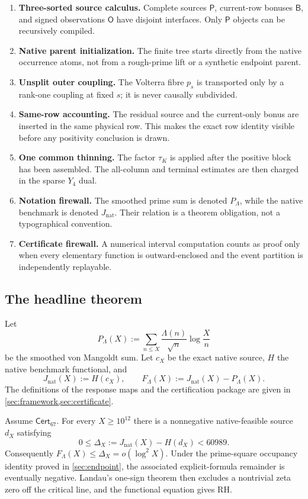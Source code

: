 \documentclass[11pt]{article}
\theoremstyle{definition}
\theoremstyle{remark}
\newcommand{\RH}{\mathrm{RH}}
\newcommand{\1}{\mathbf 1}
\newcommand{\Cert}{\mathsf{Cert}_{67}}
\newcommand{\Src}{\mathsf P}
\newcommand{\Bonus}{\mathsf B}
\newcommand{\Obs}{\mathsf O}
\newcommand{\Nat}{\mathrm{nat}}
\begin{document}
\begin{enumerate}
\item \textbf{Three-sorted source calculus.}  Complete sources \(\Src\), current-row bonuses \(\Bonus\), and signed observations \(\Obs\) have disjoint interfaces.  Only \(\Src\) objects can be recursively compiled.
\item \textbf{Native parent initialization.}  The finite tree starts directly from the native occurrence atoms, not from a rough-prime lift or a synthetic endpoint parent.
\item \textbf{Unsplit outer coupling.}  The Volterra fibre \(p_s\) is transported only by a rank-one coupling at fixed \(s\); it is never causally subdivided.
\item \textbf{Same-row accounting.}  The residual source and the current-only bonus are inserted in the same physical row.  This makes the exact row identity visible before any positivity conclusion is drawn.
\item \textbf{One common thinning.}  The factor \(\tau_K\) is applied after the positive block has been assembled.  The all-column and terminal estimates are then charged in the sparse \(Y_4\) dual.
\item \textbf{Notation firewall.}  The smoothed prime sum is denoted \(P_\Lambda\), while the native benchmark is denoted \(J_{\Nat}\).  Their relation is a theorem obligation, not a typographical convention.
\item \textbf{Certificate firewall.}  A numerical interval computation counts as proof only when every elementary function is outward-enclosed and the event partition is independently replayable.
\end{enumerate}

\subsection{The headline theorem}

Let
\begin{equation}\label{eq:prime-sum}
P_\Lambda(X):=\sum_{n\le X}\frac{\Lambda(n)}{\sqrt n}\log\frac Xn
\end{equation}
be the smoothed von Mangoldt sum.  Let \(c_X\) be the exact native source, \(H\) the native benchmark functional, and
\[
J_{\Nat}(X):=H(c_X),\qquad F_\Lambda(X):=J_{\Nat}(X)-P_\Lambda(X).
\]
The definitions of the response maps and the certification package are given in \cref{sec:framework,sec:certificate}.

\begin{resultbox}
Assume \(\Cert\).  For every \(X\ge 10^{12}\) there is a nonnegative native-feasible source \(d_X\) satisfying
\[
0\le \Delta_X:=J_{\Nat}(X)-H(d_X)<60989.
\]
Consequently \(F_\Lambda(X)\le \Delta_X=o(\log^2X)\).  Under the prime-square occupancy identity proved in \cref{sec:endpoint}, the associated explicit-formula remainder is eventually negative.  Landau's one-sign theorem then excludes a nontrivial zeta zero off the critical line, and the functional equation gives \(\RH\).
\end{resultbox}
\end{document}
